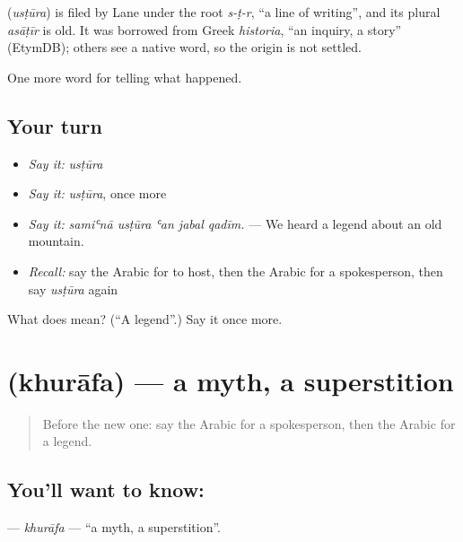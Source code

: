 \begin{cousinweb}
\textbf{} (\emph{usṭūra}) is filed by Lane under the root \emph{s-ṭ-r}, \textquotedblleft{}a line of writing\textquotedblright{}, and its plural \emph{asāṭīr} is old. It was borrowed from Greek \emph{historia}, \textquotedblleft{}an inquiry, a story\textquotedblright{} (EtymDB); others see a native word, so the origin is not settled.
\end{cousinweb}

\begin{grammarlens}[title={What you've built}]
One more word for telling what happened.
\end{grammarlens}

\subsection*{Your turn}
\begin{itemize}
\raggedright
  \item \emph{Say it:} \emph{usṭūra}
  \item \emph{Say it:} \emph{usṭūra}, once more
  \item \emph{Say it:} \emph{samiʿnā usṭūra ʿan jabal qadīm.} — We heard a legend about an old mountain.
  \item \emph{Recall:} say the Arabic for to host, then the Arabic for a spokesperson, then say \emph{usṭūra} again
\end{itemize}

\begin{tcolorbox}[breakable,colback=teal!4,colframe=teal!35!black,title={Before you move on}]
What does  mean? (\textquotedblleft{}A legend\textquotedblright{}.) Say it once more.
\end{tcolorbox}
\section[\texorpdfstring{\ar{خرافة} (khurāfa)}{خرافة (khurāfa)}]{ (khurāfa) — a myth, a superstition}

\label{lesson:AR-C303-khurafa}



\begin{quote}
Before the new one: say the Arabic for a spokesperson, then the Arabic for a legend.
\end{quote}

\subsection*{You'll want to know: }
\textbf{} — \emph{khurāfa} — \textquotedblleft{}a myth, a superstition\textquotedblright{}.


